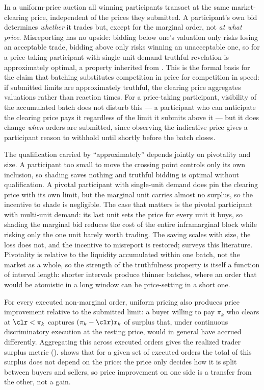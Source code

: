 In a uniform-price auction all winning participants transact at the same
market-clearing price, independent of the prices they submitted. A
participant's own bid determines \emph{whether} it trades but, except for
the marginal order, not \emph{at what price}. Misreporting has no upside:
bidding below one's valuation only risks losing an acceptable trade,
bidding above only risks winning an unacceptable one, so for a
price-taking participant with single-unit demand truthful revelation is
approximately optimal, a property inherited from
\citet{vickrey1961counterspeculation}. This is the formal basis for the
claim that batching substitutes competition in price for competition in
speed: if submitted limits are approximately truthful, the clearing price
aggregates valuations rather than reaction times. For a price-taking
participant, visibility of the accumulated batch does not disturb this ---
a participant who can anticipate the clearing price pays it regardless of
the limit it submits above it --- but it does change \emph{when} orders
are submitted, since
observing the indicative price gives a participant reason to withhold
until shortly before the batch closes.

The qualification carried by ``approximately'' depends jointly on
pivotality and size. A participant too small to move the crossing point
controls only its own inclusion, so shading saves nothing and truthful
bidding is optimal without qualification. A pivotal participant with
single-unit demand does pin the clearing price with its own limit, but the
marginal unit carries almost no surplus, so the incentive to shade is
negligible. The case that matters is the pivotal participant with
multi-unit demand: its last unit sets the price for every unit it buys, so
shading the marginal bid reduces the cost of the entire inframarginal
block while risking only the one unit barely worth trading. The saving
scales with size, the loss does not, and the incentive to misreport is
restored; \citet{klemperer1999auction} surveys this literature. Pivotality
is relative to the liquidity accumulated within one batch, not the market
as a whole, so the strength of the truthfulness property is itself a
function of interval length: shorter intervals produce thinner batches,
where an order that would be atomistic in a long window can be
price-setting in a short one.

For every executed non-marginal order, uniform pricing also produces price
improvement relative to the submitted limit: a buyer willing to pay
$\pi_k$ who clears at $\clr < \pi_k$ captures $(\pi_k - \clr) x_k$ of
surplus that, under continuous discriminatory execution at the resting
price, would in general have accrued differently. Aggregating this across
executed orders gives the realized trader surplus metric
().  shows that for a given
set of executed orders the total of this surplus does not depend on the
price: the price only decides how it is split between buyers and sellers,
so price improvement on one side is a transfer from the other, not a gain.

